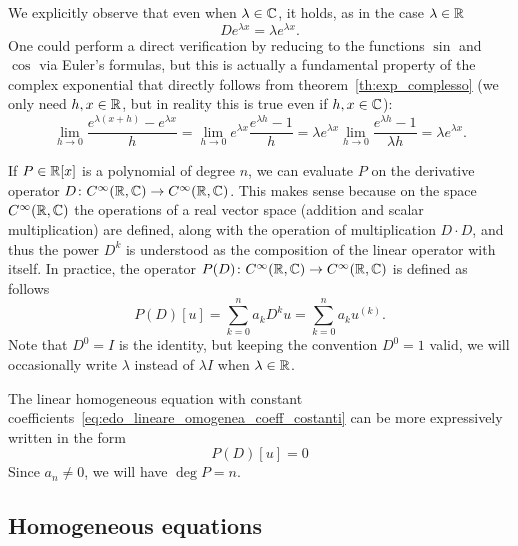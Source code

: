 We explicitly observe that even when $\lambda \in {\mathbb C}$, it holds,
as in the case $\lambda\in {\mathbb R}$
\begin{equation}\label{eq:499375}
  D e^{\lambda x} = \lambda e^{\lambda x}.
\end{equation}
One could perform a direct verification by reducing to the functions $\sin$ and
$\cos$
via Euler's formulas, but this
is actually a fundamental property of the complex exponential
that directly follows from theorem~\ref{th:exp_complesso} (we only need $h,x\in
{\mathbb R}$, but in reality
this is true even if $h,x\in {\mathbb C}$):
\[
 \lim_{h\to 0} \frac{e^{\lambda(x+h)}-e^{\lambda x}}{h}
 = \lim_{h\to 0} e^{\lambda x}\frac{e^{\lambda h}-1}{h}
 = \lambda e^{\lambda x} \lim_{h\to 0}\frac{e^{\lambda h}-1}{\lambda h}
 = \lambda e^{\lambda x}.
\]

If $P\in {\mathbb R}[x]$ is a polynomial of degree $n$,
we can evaluate $P$ on the derivative operator
$D\colon C^\infty({\mathbb R},{\mathbb C})\to C^\infty({\mathbb R},{\mathbb C})$.
This makes sense because on the space $C^\infty({\mathbb R},{\mathbb C})$
the operations of a real vector space
(addition and scalar multiplication) are defined, along with the operation
of multiplication $D\cdot D$, and thus the power
$D^k$ is understood as the composition of the linear operator
with itself.
In practice, the operator
$P(D)\colon C^\infty({\mathbb R},{\mathbb C}) \to C^\infty({\mathbb R},{\mathbb C})$
is defined as follows
\[
  P(D)[u] = \sum_{k=0}^n a_k D^k u = \sum_{k=0}^n a_k u^{(k)}.
\]
Note that $D^0 = I$ is the identity, but keeping the convention
$D^0 = 1$ valid, we will occasionally write
$\lambda$ instead of $\lambda I$ when $\lambda\in {\mathbb R}$.

The linear homogeneous equation with constant
coefficients~\eqref{eq:edo_lineare_omogenea_coeff_costanti}
can be more expressively written in the form
\[
  P(D)[u] = 0
\]
Since $a_n\neq 0$, we will have $\deg P = n$.

\subsection{Homogeneous equations}

